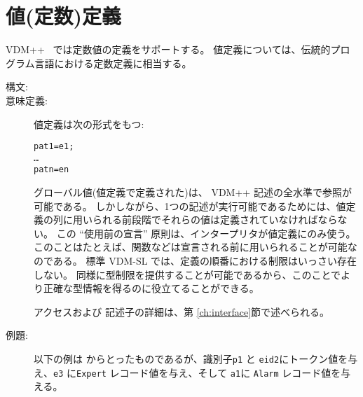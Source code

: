 \documentclass[\pformat,12pt]{jarticle}
\newcommand{\vdmslpp}[2]{%
#2
}
\newcommand{\vdmsl}{VDM-SL}
\newcommand{\vdmpp}{VDM++}
\begin{document}
\section{値(定数)定義} \label{valuedef}

\vdmslpp{\vdmsl}{\vdmpp}\ では定数値の定義をサポートする。 
値定義については、伝統的プログラム言語における定数定義に相当する。

\begin{description}
\item[構文:]




\item[意味定義:] 値定義は次の形式をもつ:
  \begin{alltt}
       pat1 = e1;
      \ldots
       patn = en
  \end{alltt}

  
グローバル値(値定義で定義された)は、 \vdmslpp{\vdmsl}{\vdmpp} 記述の全水準で参照が可能である。
しかしながら、1つの記述が実行可能であるためには、値定義の列に用いられる前段階でそれらの値は定義されていなければならない。 
この ``使用前の宣言'' 原則は、インタープリタが値定義にのみ使う。
 このことはたとえば、関数などは宣言される前に用いられることが可能なのである。
標準 VDM-SL では、定義の順番における制限はいっさい存在しない。
同様に型制限を提供することが可能であるから、このことでより正確な型情報を得るのに役立てることができる。

アクセスおよび  記述子の詳細は、第 \ref{ch:interface}節で述べられる。 

\item[例題:] 以下の例は \cite{Fitzgerald&98} からとったものであるが、識別子\texttt{p1} と \texttt{eid2}にトークン値を与え、\texttt{e3} に\texttt{Expert} レコード値を与え、そして \texttt{a1}に \texttt{Alarm} レコード値を与える。
\begin{alltt}


\end{alltt}
\end{description}
\end{document}
